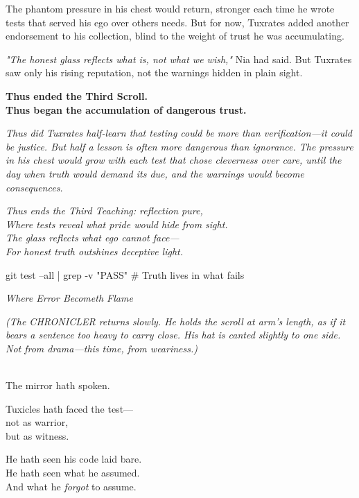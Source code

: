 The phantom pressure in his chest would return, stronger each time he wrote tests that served his ego over others\textquotesingle{} needs. But for now, Tuxrates added another endorsement to his collection, blind to the weight of trust he was accumulating.

\emph{"The honest glass reflects what is, not what we wish,"} Nia had said. But Tuxrates saw only his rising reputation, not the warnings hidden in plain sight.

\textbf{Thus ended the Third Scroll.}\\
\textbf{Thus began the accumulation of dangerous trust.}

\emph{Thus did Tuxrates half-learn that testing could be more than verification---it could be justice. But half a lesson is often more dangerous than ignorance. The pressure in his chest would grow with each test that chose cleverness over care, until the day when truth would demand its due, and the warnings would become consequences.}

\bookdivider

\emph{Thus ends the Third Teaching: reflection pure,}\\
\emph{Where tests reveal what pride would hide from sight.}\\
\emph{The glass reflects what ego cannot face---}\\
\emph{For honest truth outshines deceptive light.}

\begin{codeblock}
git test --all | grep -v "PASS"
# Truth lives in what fails
\end{codeblock}

\bookdivider

\label{performing_arts-closing-of-the-scroll}

\emph{Where Error Becometh Flame}

\emph{(The CHRONICLER returns slowly. He holds the scroll at arm's length, as if it bears a sentence too heavy to carry close. His hat is canted slightly to one side. Not from drama---this time, from weariness.)}

\\
The mirror hath spoken.

Tuxicles hath faced the test---\\
not as warrior,\\
but as witness.

He hath seen his code laid bare.\\
He hath seen what he assumed.\\
And what he \emph{forgot} to assume.

